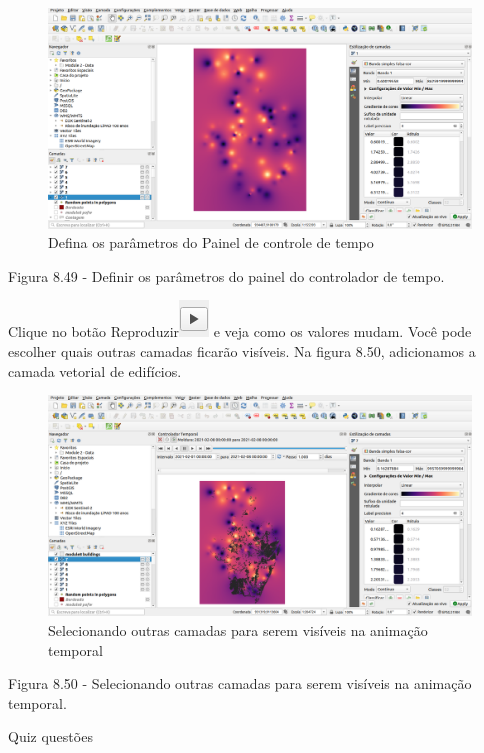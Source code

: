 \documentclass[
]{book}
\begin{document}
\begin{figure}
\centering
\includegraphics{media/modulo8/fig849.png}
\caption{Defina os parâmetros do Painel de controle de tempo}
\end{figure}

Figura 8.49 - Definir os parâmetros do painel do controlador de tempo.

Clique no botão Reproduzir\includegraphics{media/modulo8/play-btn.png} e veja como os valores mudam. Você pode escolher quais outras camadas ficarão visíveis. Na figura 8.50, adicionamos a camada vetorial de edifícios.

\begin{figure}
\centering
\includegraphics{media/modulo8/fig850.png}
\caption{Selecionando outras camadas para serem visíveis na animação temporal}
\end{figure}

Figura 8.50 - Selecionando outras camadas para serem visíveis na animação temporal.

Quiz questões
\end{document}
